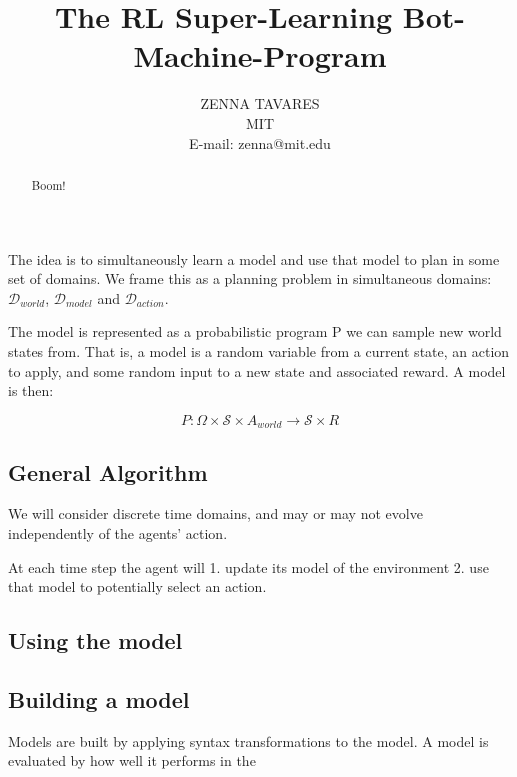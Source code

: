 \documentclass{tlp}
\begin{document}


\title{The RL Super-Learning Bot-Machine-Program}

\author[Z. Tavares, M. Siegel]
{ZENNA TAVARES \\
MIT\\
E-mail: zenna@mit.edu
}


\pagerange{\pageref{firstpage}--\pageref{lastpage}}

\maketitle

\label{firstpage}

\begin{abstract}
%
Boom!

\end{abstract}

The idea is to simultaneously learn a model and use that model to plan in some set of domains.
We frame this as a planning problem in simultaneous domains: $\mathcal{D}_{world}$, $\mathcal{D}_{model}$ and $\mathcal{D}_{action}$.

The model is represented as a probabilistic program P we can sample new world states from.
That is, a model is a random variable from a current state, an action to apply, and some random input to a new state and associated reward.
A model is then:

\[
P : \Omega \times \mathcal{S} \times A_{world} \to \mathcal{S} \times R
\]

\subsection{General Algorithm}
We will consider discrete time domains, and may or may not evolve independently of the agents' action.

At each time step the agent will 1. update its model of the environment 2. use that model to potentially select an action.

\subsection{Using the model}


\subsection{Building a model}
Models are built by applying syntax transformations to the model.
A model is evaluated by how well it performs in the 
\end{document}

